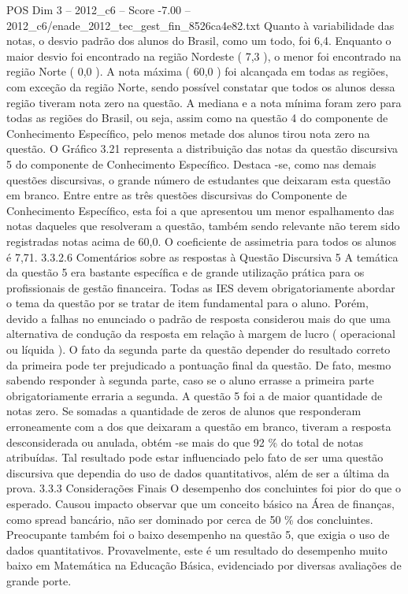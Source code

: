 \begin{textsample}{POS Dim 3 – 2012\_c6 – Score -7.00 – 2012\_c6/enade\_2012\_tec\_gest\_fin\_8526ca4e82.txt}
Quanto à variabilidade das notas, o desvio padrão dos alunos do Brasil, como um todo, foi 6,4.
Enquanto o maior desvio foi encontrado na região Nordeste ( 7,3 ), o menor foi encontrado na região Norte ( 0,0 ).
A nota máxima ( 60,0 ) foi alcançada em todas as regiões, com exceção da região Norte, sendo possível constatar que todos os alunos dessa região tiveram nota zero na questão.
A mediana e a nota mínima foram zero para todas as regiões do Brasil, ou seja, assim como na questão 4 do componente de Conhecimento Específico, pelo menos metade dos alunos tirou nota zero na questão.
O Gráfico 3.21 representa a distribuição das notas da questão discursiva 5 do componente de Conhecimento Específico.
Destaca -se, como nas demais questões discursivas, o grande número de estudantes que deixaram esta questão em branco.
Entre entre as três questões discursivas do Componente de Conhecimento Específico, esta foi a que apresentou um menor espalhamento das notas daqueles que resolveram a questão, também sendo relevante não terem sido registradas notas acima de 60,0.
O coeficiente de assimetria para todos os alunos é 7,71. 3.3.2.6 Comentários sobre as respostas à Questão Discursiva 5 A temática da questão 5 era bastante específica e de grande utilização prática para os profissionais de gestão financeira.
Todas as IES devem obrigatoriamente abordar o tema da questão por se tratar de item fundamental para o aluno.
Porém, devido a falhas no enunciado o padrão de resposta considerou mais do que uma alternativa de condução da resposta em relação à margem de lucro ( operacional ou líquida ).
O fato da segunda parte da questão depender do resultado correto da primeira pode ter prejudicado a pontuação final da questão.
De fato, mesmo sabendo responder à segunda parte, caso se o aluno errasse a primeira parte obrigatoriamente erraria a segunda.
A questão 5 foi a de maior quantidade de notas zero.
Se somadas a quantidade de zeros de alunos que responderam erroneamente com a dos que deixaram a questão em branco, tiveram a resposta desconsiderada ou anulada, obtém -se mais do que 92 \% do total de notas atribuídas.
Tal resultado pode estar influenciado pelo fato de ser uma questão discursiva que dependia do uso de dados quantitativos, além de ser a última da prova. 3.3.3 Considerações Finais O desempenho dos concluintes foi pior do que o esperado.
Causou impacto observar que um conceito básico na Área de finanças, como spread bancário, não ser dominado por cerca de 50 \% dos concluintes.
Preocupante também foi o baixo desempenho na questão 5, que exigia o uso de dados quantitativos.
Provavelmente, este é um resultado do desempenho muito baixo em Matemática na Educação Básica, evidenciado por diversas avaliações de grande porte.

\end{textsample}
